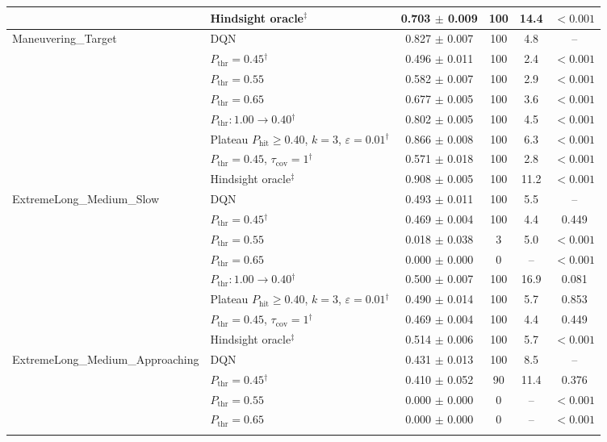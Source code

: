 \begin{table}[htbp]
\begin{tabular}{llcccc}
 & Hindsight oracle$^{\ddagger}$ & 0.703 $\pm$ 0.009 & 100 & 14.4 & $<0.001$ \\
\midrule
\multirow{8}{*}{Maneuvering\_Target} & DQN & 0.827 $\pm$ 0.007 & 100 & 4.8 & -- \\
 & $P_{\mathrm{thr}}=0.45$$^{\dagger}$ & 0.496 $\pm$ 0.011 & 100 & 2.4 & $<0.001$ \\
 & $P_{\mathrm{thr}}=0.55$ & 0.582 $\pm$ 0.007 & 100 & 2.9 & $<0.001$ \\
 & $P_{\mathrm{thr}}=0.65$ & 0.677 $\pm$ 0.005 & 100 & 3.6 & $<0.001$ \\
 & $P_{\mathrm{thr}}: 1.00 \to 0.40$$^{\dagger}$ & 0.802 $\pm$ 0.005 & 100 & 4.5 & $<0.001$ \\
 & Plateau $P_{\mathrm{hit}}\geq0.40$, $k=3$, $\varepsilon=0.01$$^{\dagger}$ & 0.866 $\pm$ 0.008 & 100 & 6.3 & $<0.001$ \\
 & $P_{\mathrm{thr}}=0.45$, $\tau_{\mathrm{cov}}=1$$^{\dagger}$ & 0.571 $\pm$ 0.018 & 100 & 2.8 & $<0.001$ \\
 & Hindsight oracle$^{\ddagger}$ & 0.908 $\pm$ 0.005 & 100 & 11.2 & $<0.001$ \\
\midrule
\multirow{8}{*}{ExtremeLong\_Medium\_Slow} & DQN & 0.493 $\pm$ 0.011 & 100 & 5.5 & -- \\
 & $P_{\mathrm{thr}}=0.45$$^{\dagger}$ & 0.469 $\pm$ 0.004 & 100 & 4.4 & 0.449 \\
 & $P_{\mathrm{thr}}=0.55$ & 0.018 $\pm$ 0.038 & 3 & 5.0 & $<0.001$ \\
 & $P_{\mathrm{thr}}=0.65$ & 0.000 $\pm$ 0.000 & 0 & -- & $<0.001$ \\
 & $P_{\mathrm{thr}}: 1.00 \to 0.40$$^{\dagger}$ & 0.500 $\pm$ 0.007 & 100 & 16.9 & 0.081 \\
 & Plateau $P_{\mathrm{hit}}\geq0.40$, $k=3$, $\varepsilon=0.01$$^{\dagger}$ & 0.490 $\pm$ 0.014 & 100 & 5.7 & 0.853 \\
 & $P_{\mathrm{thr}}=0.45$, $\tau_{\mathrm{cov}}=1$$^{\dagger}$ & 0.469 $\pm$ 0.004 & 100 & 4.4 & 0.449 \\
 & Hindsight oracle$^{\ddagger}$ & 0.514 $\pm$ 0.006 & 100 & 5.7 & $<0.001$ \\
\midrule
\multirow{8}{*}{ExtremeLong\_Medium\_Approaching} & DQN & 0.431 $\pm$ 0.013 & 100 & 8.5 & -- \\
 & $P_{\mathrm{thr}}=0.45$$^{\dagger}$ & 0.410 $\pm$ 0.052 & 90 & 11.4 & 0.376 \\
 & $P_{\mathrm{thr}}=0.55$ & 0.000 $\pm$ 0.000 & 0 & -- & $<0.001$ \\
 & $P_{\mathrm{thr}}=0.65$ & 0.000 $\pm$ 0.000 & 0 & -- & $<0.001$ \\
$$
\end{tabular}
\end{table}

